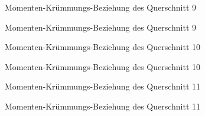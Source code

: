 \documentclass[
  11pt,
  letterpaper,
]{scrreprt}
\begin{document}
\begin{figure}[H]


\caption{\label{fig-qs_9}Momenten-Krümmungs-Beziehung des Querschnitt 9}

\end{figure}%

\begin{figure}[H]


\caption{\label{fig-m_chi_9}Momenten-Krümmungs-Beziehung des Querschnitt
9}

\end{figure}%

\begin{figure}[H]


\caption{\label{fig-qs_10}Momenten-Krümmungs-Beziehung des Querschnitt
10}

\end{figure}%

\begin{figure}[H]


\caption{\label{fig-m_chi_10}Momenten-Krümmungs-Beziehung des
Querschnitt 10}

\end{figure}%

\begin{figure}[H]


\caption{\label{fig-qs_11}Momenten-Krümmungs-Beziehung des Querschnitt
11}

\end{figure}%

\begin{figure}[H]


\caption{\label{fig-m_chi_11}Momenten-Krümmungs-Beziehung des
Querschnitt 11}

\end{figure}%
\end{document}
